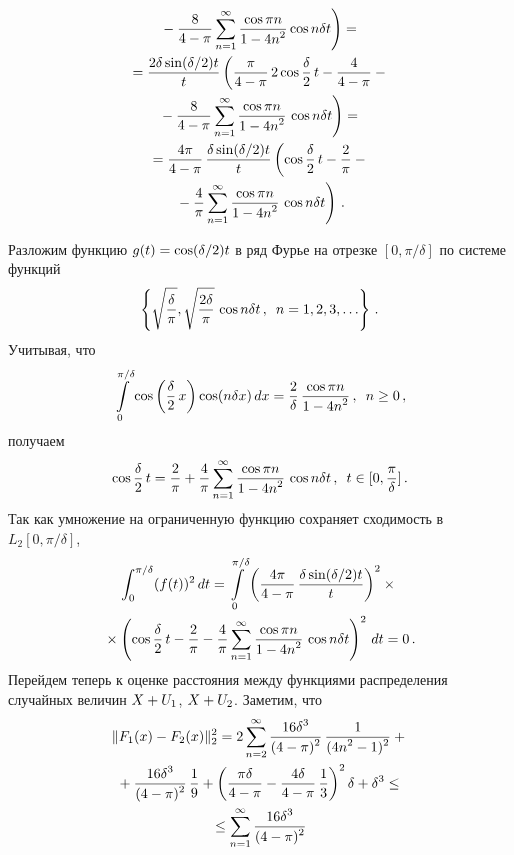 \begin{multicols}{2}
\begin{multline*}
\left.{}-
\fr{8  }{4-\pi}
\sum\limits_{n=1}^{\infty} \fr{\cos \pi n}{1 - 4n^2 }
 \cos n \delta t
\right)={}
\\{}
= \fr{2\delta \sin ({\delta}/{2}) t}{t}\left(
\fr{\pi  }{4-\pi}\,
 2 \cos \fr{\delta}{2}\, t -  \fr{4  }{4-\pi} -{}\right.\\
\left. {}-
\fr{8  }{4-\pi}
\sum\limits_{n=1}^{\infty} \fr{\cos \pi n}{1 - 4n^2 }
\, \cos n \delta t
\right) ={}
\\{}
=\fr{4 \pi  }{4-\pi}\, \fr{\delta \sin ({\delta}/{2}) t}{t}\left(
  \cos \fr{\delta}{2} \,t -  \fr{2  }{ \pi} -{}\right.\\
\left.  {}-
\fr{4  }{ \pi}
\sum\limits_{n=1}^{\infty} \fr{\cos \pi n}{1 - 4n^2 }\,
 \cos n \delta t
\right)\,.
\end{multline*}

Разложим функцию $g(t) \hm=   \cos ({\delta}/{2}) t$ в ряд Фурье на
отрезке $[0, {\pi}/{\delta}]$ по системе функций
$$
\left\{\sqrt{\fr{\delta}{\pi}}, \sqrt{\fr{2\delta}{\pi}}\, \cos n
\delta t \,,\enskip n=1,2,3, \ldots \right\}\,.
$$
Учитывая, что
$$
\int\limits_0^{{\pi}/{\delta}}  \cos\left(\fr{\delta}{2}\, x\right)  \cos(  n \delta x) \, dx =
\fr{2}{\delta}\,\fr{\cos \pi n}{1 - 4n^2 }\,,\enskip   n\ge0\,,
$$
получаем
$$
\cos \fr{\delta}{2}\, t =   \fr{2  }{ \pi} +
\fr{4  }{ \pi}
\sum\limits_{n=1}^{\infty} \fr{\cos \pi n}{1 - 4n^2 }
\, \cos n \delta t\,, \enskip t \in [0, \fr{\pi}{\delta}]\,.
$$
Так как умножение на ограниченную функцию сохраняет сходимость в
$L_2[0, {\pi}/{\delta}]$,
\begin{multline*}
 \int_0^{{\pi}/{\delta}} (f(t))^2\,dt =
\int\limits_0^{{\pi}/{\delta}} \left(\fr{4 \pi  }{4-\pi}\,
 \fr{\delta \sin ({\delta}/{2}) t}{t}\right)^2\times{}\\
 {}\times
\left(
  \cos \fr{\delta}{2}\, t -  \fr{2  }{ \pi} -
\fr{4  }{ \pi}
\sum\limits_{n=1}^{\infty} \fr{\cos \pi n}{1 - 4n^2 }
\, \cos n \delta t
\right)^2\,dt =0\,.
\end{multline*}
Перейдем теперь к оценке  расстояния между функциями распределения
случайных величин $X\hm+U_1$,  $X\hm+U_2$.  Заметим, что
\begin{multline*}
\|F_1(x) - F_2(x) \|_2^2 = 2\sum\limits_{n=2}^\infty 
\fr{16 \delta^3 }{(4-\pi)^2} \,\fr{1}{(4n^2 - 1 )^2} +{}\\
{}+
\fr{16 \delta^3 }{(4-\pi)^2} \,\fr{1}{9} +
\left(\fr{ \pi \delta}{4-\pi} - \fr{4 \delta }{4-\pi}
\,\fr{1}{3}\right)^2 \delta + \delta^3\le{}
\\
{}\le \sum\limits_{n=1}^\infty
\fr{16 \delta^3 }{(4-\pi)^2} \,

\end{multline*}
\end{multicols}
